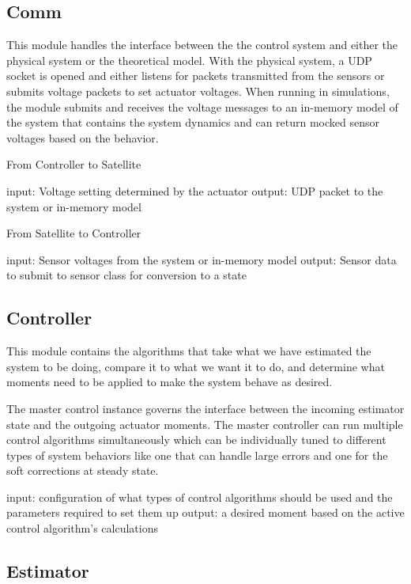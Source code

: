 \subsection{Comm}
\label{subsec:Comm}


This module handles the interface between the the control system and either the physical system or the theoretical model. With the physical system, a UDP socket is opened and either listens for packets transmitted from the sensors or submits voltage packets to set actuator voltages. When running in simulations, the module submits and receives the voltage messages to an in-memory model of the system that contains the system dynamics and can return mocked sensor voltages based on the behavior.

From Controller to Satellite

    input: Voltage setting determined by the actuator
    output: UDP packet to the system or in-memory model

From Satellite to Controller

    input: Sensor voltages from the system or in-memory model
    output: Sensor data to submit to sensor class for conversion to a state

\subsection{Controller}
\label{subsec:Controller}


This module contains the algorithms that take what we have estimated the system to be doing, compare it to what we want it to do, and determine what moments need to be applied to make the system behave as desired.

The master control instance governs the interface between the incoming estimator state and the outgoing actuator moments. The master controller can run multiple control algorithms simultaneously which can be individually tuned to different types of system behaviors like one that can handle large errors and one for the soft corrections at steady state.

    input: configuration of what types of control algorithms should be used and the parameters required to set them up
    output: a desired moment based on the active control algorithm's calculations

\subsection{Estimator}
\label{subsec:Estimator}


